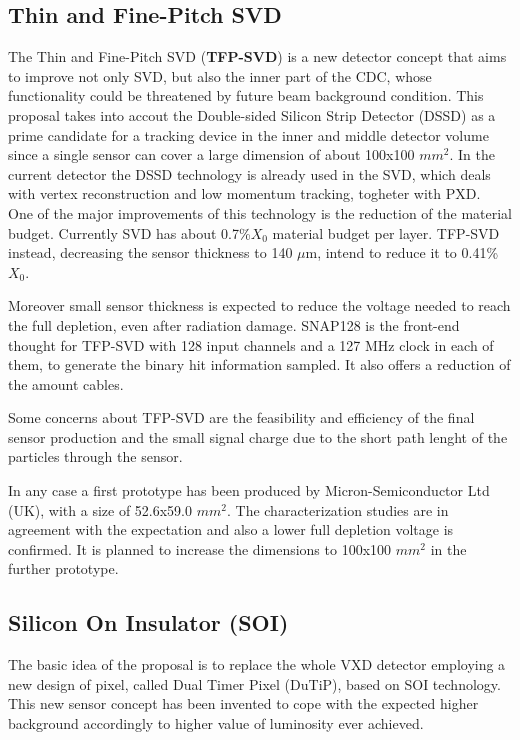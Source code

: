 \subsection{Thin and Fine-Pitch SVD}

The Thin and Fine-Pitch SVD (\textbf{TFP-SVD}) is a new detector concept that aims to improve not only SVD, but also the inner part of the CDC, whose functionality could be threatened by future beam background condition.
This proposal takes into accout the Double-sided Silicon Strip Detector (DSSD) as a prime candidate for a tracking device in the inner and middle detector volume since a single sensor can cover a large dimension of about 100x100 $mm^{2}$. In the current detector the DSSD technology is already used in the SVD, which deals with vertex reconstruction and low momentum tracking, togheter with PXD.\\

One of the major improvements of this technology is the reduction of the material budget.
Currently SVD has about 0.7\%$X_{0}$ material budget per layer. TFP-SVD instead, decreasing the sensor thickness to 140 $\mu$m, intend to reduce it to 0.41\%$X_{0}$. 

Moreover small sensor thickness is expected to reduce the voltage needed to reach the full depletion, even after radiation damage. 
SNAP128 is the front-end thought for TFP-SVD with 128 input channels and a 127 MHz clock in each of them, to generate the binary hit information sampled. It also offers a reduction of the amount cables.

Some concerns about TFP-SVD are the feasibility and efficiency of the final sensor production and the small signal charge due to the short path lenght of the particles through the sensor.

In any case a first prototype has been produced by Micron-Semiconductor Ltd (UK), with a size of 52.6x59.0 $mm^{2}$. The characterization studies are in agreement with the expectation and also a lower full depletion voltage is confirmed. It is planned to increase the dimensions to 100x100 $mm^{2}$ in the further prototype.


\subsection{Silicon On Insulator (SOI)}

The basic idea of the proposal is to replace the whole VXD detector employing a new design of pixel, called Dual Timer Pixel (DuTiP), based on SOI technology. This new sensor concept has been invented to cope with the expected higher background accordingly to higher value of luminosity ever achieved.


